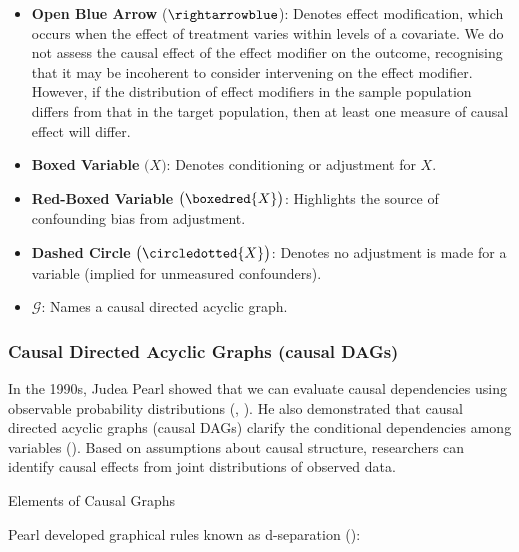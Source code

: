 \documentclass[
  single column]{article}
\begin{document}
\begin{itemize}
\item
  \textbf{Open Blue Arrow} (\(\rightarrowblue\)): Denotes effect
  modification, which occurs when the effect of treatment varies within
  levels of a covariate. We do not assess the causal effect of the
  effect modifier on the outcome, recognising that it may be incoherent
  to consider intervening on the effect modifier. However, if the
  distribution of effect modifiers in the sample population differs from
  that in the target population, then at least one measure of causal
  effect will differ.
\item
  \textbf{Boxed Variable} \(\big(\boxed{X}\big)\): Denotes conditioning
  or adjustment for \(X\).
\item
  \textbf{Red-Boxed Variable} \(\big(\boxedred{X}\big)\): Highlights the
  source of confounding bias from adjustment.
\item
  \textbf{Dashed Circle} \(\big(\circledotted{X}\big)\): Denotes no
  adjustment is made for a variable (implied for unmeasured
  confounders).
\item
  \textbf{\(\mathcal{G}\)}: Names a causal directed acyclic graph.
\end{itemize}

\subsubsection{Causal Directed Acyclic Graphs (causal
DAGs)}\label{causal-directed-acyclic-graphs-causal-dags}

In the 1990s, Judea Pearl showed that we can evaluate causal
dependencies using observable probability distributions
(, ).
He also demonstrated that causal directed acyclic graphs (causal DAGs)
clarify the conditional dependencies among variables
(). Based on assumptions about
causal structure, researchers can identify causal effects from joint
distributions of observed data.

\begin{table}

\caption{\label{tbl-terminologygeneral}Elements of Causal Graphs}

\centering{

\terminologydirectedgraph

}

\end{table}%

Pearl developed graphical rules known as d-separation
():
\end{document}
